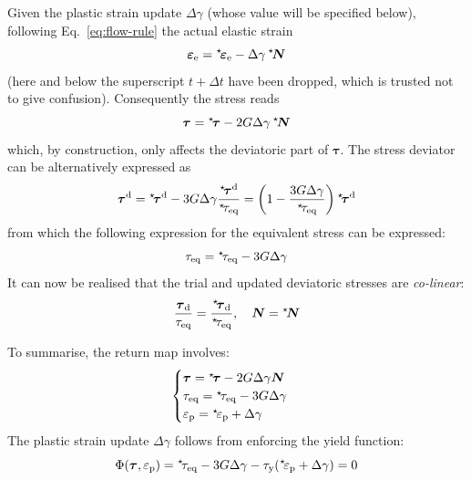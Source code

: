 \documentclass{goose-article}
\newcommand\ST[1]{\hspace*{-.3em}~^\star\!#1}
\newcommand\T[1]{\bm{{#1}}}
\begin{document}
Given the plastic strain update $\Delta \gamma$ (whose value will be specified below), following Eq.~\eqref{eq:flow-rule} the actual elastic strain
\begin{equation}
  \T{\varepsilon}_\mathrm{e} = \ST{\T{\varepsilon}}_\mathrm{e} - \Delta \gamma \,\ST{\T{N}}
\end{equation}
(here and below the superscript $t + \Delta t$ have been dropped, which is trusted not to give confusion). Consequently the stress reads
\begin{equation}
  \T{\tau} = \ST{\T{\tau}} - 2 G \Delta \gamma \, \ST{\T{N}}
\end{equation}
which, by construction, only affects the deviatoric part of $\T{\tau}$. The stress deviator can be alternatively expressed as
\begin{equation}
  \T{\tau}^\mathrm{d} = \ST{\T{\tau}}^\mathrm{d} - 3 G \Delta \gamma \frac{\ST{\T{\tau}}^\mathrm{d}}{\ST{\tau}_\mathrm{eq}} = \left( 1 - \frac{3 G \Delta \gamma }{\ST{\tau}_\mathrm{eq}} \right) \ST{\T{\tau}}^\mathrm{d}
\end{equation}
from which the following expression for the equivalent stress can be expressed:
\begin{equation}
  \tau_\mathrm{eq} = \ST{\tau}_\mathrm{eq} - 3 G \Delta \gamma
\end{equation}
It can now be realised that the trial and updated deviatoric stresses are \emph{co-linear}:
\begin{equation}
  \frac{ \T{\tau}_\mathrm{d} }{ \tau_\mathrm{eq} }
  =
  \frac{ \ST{\T{\tau}}_\mathrm{d} }{ \ST{\tau}_\mathrm{eq} }, \quad
  \T{N} = \ST{\T{N}}
\end{equation}

To summarise, the return map involves:
\begin{equation}
  \begin{cases}
    \T{\tau} = \ST{\T{\tau}} - 2 G \Delta \gamma \T{N}
    \\
    \tau_\mathrm{eq} = \ST{\tau}_\mathrm{eq} - 3 G \Delta \gamma
    \\
    \varepsilon_\mathrm{p} = \ST{\varepsilon}_\mathrm{p} + \Delta \gamma
  \end{cases}
\end{equation}
The plastic strain update $\Delta \gamma$ follows from enforcing the yield function:
\begin{equation}
  \Phi(\T{\tau}, \varepsilon_\mathrm{p}) = \ST{\tau}_\mathrm{eq} - 3 G \Delta \gamma - \tau_\mathrm{y} ( \ST{\varepsilon}_\mathrm{p} + \Delta \gamma ) = 0
  \label{eq:return-map:yield-function}
\end{equation}
\end{document}
